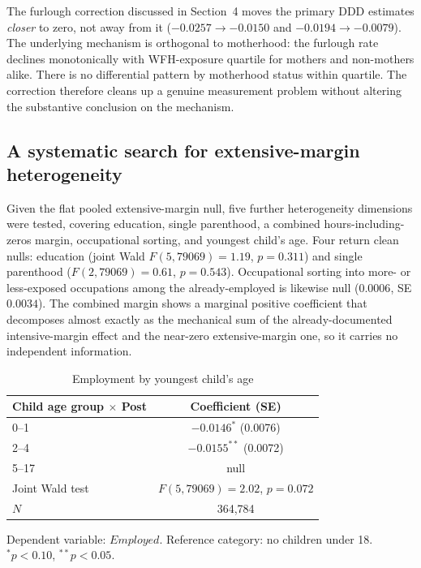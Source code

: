 \documentclass[11pt]{article}
\begin{document}
The furlough correction discussed in Section~4 moves the primary DDD estimates \emph{closer} to zero, not away from it ($-0.0257\rightarrow-0.0150$ and $-0.0194\rightarrow-0.0079$). The underlying mechanism is orthogonal to motherhood: the furlough rate declines monotonically with WFH-exposure quartile for mothers and non-mothers alike. There is no differential pattern by motherhood status within quartile. The correction therefore cleans up a genuine measurement problem without altering the substantive conclusion on the mechanism.

\subsection{A systematic search for extensive-margin heterogeneity}

Given the flat pooled extensive-margin null, five further heterogeneity dimensions were tested, covering education, single parenthood, a combined hours-including-zeros margin, occupational sorting, and youngest child's age. Four return clean nulls: education (joint Wald $F(5,79069)=1.19$, $p=0.311$) and single parenthood ($F(2,79069)=0.61$, $p=0.543$). Occupational sorting into more- or less-exposed occupations among the already-employed is likewise null ($0.0006$, SE $0.0034$). The combined margin shows a marginal positive coefficient that decomposes almost exactly as the mechanical sum of the already-documented intensive-margin effect and the near-zero extensive-margin one, so it carries no independent information.

\begin{table}[htbp]
\centering
\caption{Employment by youngest child's age}
\label{tab:childage}
\begin{tabular}{lc}
\hline
Child age group $\times$ Post & Coefficient (SE) \\
\hline
0--1 & $-0.0146^{*}$ (0.0076) \\
2--4 & $-0.0155^{**}$ (0.0072) \\
5--17 & null \\
\hline
Joint Wald test & $F(5,79069)=2.02$, $p=0.072$ \\
$N$ & 364{,}784 \\
\hline
\end{tabular}
\par\smallskip
{\footnotesize Dependent variable: $Employed$. Reference category: no children under 18. $^{*}p<0.10$, $^{**}p<0.05$.}
\end{table}
\end{document}
